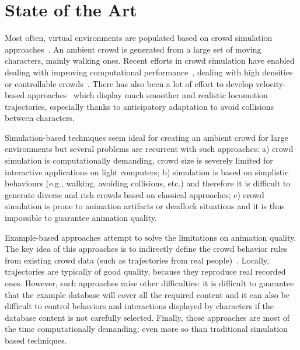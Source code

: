 \section{State of the Art}
\label{sec:star}

Most often, virtual environments are populated based on crowd simulation approaches~\cite{ThalmannBook:2013}.
An ambient crowd is generated from a large set of moving characters, mainly walking ones.
Recent efforts in crowd simulation have enabled dealing with improving computational performance~\cite{PettreCAVW:2006,Treuille:2006}, dealing with high densities~\cite{Narain:2009} or controllable crowds~\cite{Guy:2009}.
There has also been a lot of effort to develop velocity-based approaches~\cite{Paris:2007,VanDenBerg:2008} which display much smoother and realistic locomotion trajectories, especially thanks to anticipatory adaptation to avoid collisions between characters.

Simulation-based techniques seem ideal for creating an ambient crowd for large environments but several problems are recurrent with such approaches:
a) crowd simulation is computationally demanding, crowd size is severely limited for interactive applications on light computers;
b) simulation is based on simplistic behaviours (e.g., walking, avoiding collisions, etc.) and therefore it is difficult to generate diverse and rich crowds based on classical approaches;
c) crowd simulation is prone to animation artifacts or deadlock situations and it is thus impossible to guarantee animation quality. 

Example-based approaches attempt to solve the limitations on animation quality.
The key idea of this approaches is to indirectly define the crowd behavior rules from existing crowd data (such as trajectories from real people)~\cite{Lerner:2007,Ju:2010,Charalambous:2014}.
Locally, trajectories are typically of good quality, because they reproduce real recorded ones.
However, such approaches raise other difficulties: it is difficult to guarantee that the example database will cover all the required content and it can also be difficult to control behaviors and interactions displayed by characters if the database content is not carefully selected.
Finally, those approaches are most of the time computationally demanding; even more so than traditional simulation based techniques.

